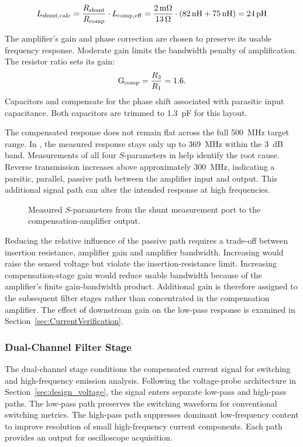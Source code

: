 \begin{equation}
	{L}_{\mathrm{shunt,calc}} = \frac{{R}_{\mathrm{shunt}}}{{R}_{\mathrm{comp}}}\cdot {L}_{\mathrm{comp,eff}} = \frac{\SI{2}{m\Omega}}{\SI{13}{\Omega}}\cdot (\SI{82}{nH}+\SI{75}{nH}) = \SI{24}{pH}
\end{equation}

The amplifier's gain and phase correction are chosen to preserve its usable frequency response.
Moderate gain limits the bandwidth penalty of amplification.
The resistor ratio sets its gain:
\begin{equation}
	\text{G}_{\text{comp}} = \frac{{R}_{\mathrm{3}}}{{R}_{\mathrm{1}}} = 1.6.
\end{equation}
Capacitors  and  compensate for the phase shift associated with parasitic input capacitance.
Both capacitors are trimmed to \SI{1.3}{pF} for this layout.

The compensated response does not remain flat across the full \SI{500}{MHz} target range.
In , the measured response stays only up to \SI{369}{MHz} within the \SI{3}{dB} band.
Measurements of all four $S$-parameters in  help identify the root cause.
Reverse transmission  increases above approximately \SI{300}{MHz}, indicating a parsitic, parallel, passive path between the amplifier input and output.
This additional signal path can alter the intended response at high frequencies.

\begin{figure}[ht]
	\centering
	
	\caption{Measured $S$-parameters from the shunt measurement port to the compensation-amplifier output.}\label{fig:VNA_AShunt_comp_S}
\end{figure}

Reducing the relative influence of the passive path requires a trade-off between insertion resistance, amplifier gain and amplifier bandwidth.
Increasing  would raise the sensed voltage but violate the insertion-resistance limit.
Increasing compensation-stage gain would reduce usable bandwidth because of the amplifier's finite gain-bandwidth product.
Additional gain is therefore assigned to the subsequent filter stages rather than concentrated in the compensation amplifier.
The effect of downstream gain on the low-pass response is examined in Section~\ref{sec:CurrentVerification}.


\FloatBarrier

\subsubsection*{Dual-Channel Filter Stage}
The dual-channel stage conditions the compensated current signal for switching and high-frequency emission analysis.
Following the voltage-probe architecture in Section~\ref{sec:design_voltage}, the signal enters separate low-pass and high-pass paths.
The low-pass path preserves the switching waveform for conventional switching metrics.
The high-pass path suppresses dominant low-frequency content to improve resolution of small high-frequency current components.
Each path provides an output for oscilloscope acquisition.


